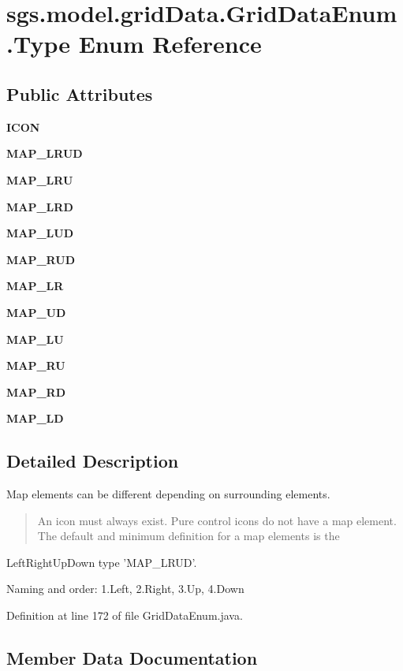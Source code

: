 \section{sgs.\-model.\-grid\-Data.\-Grid\-Data\-Enum.\-Type Enum Reference}
\label{enumsgs_1_1model_1_1grid_data_1_1_grid_data_enum_1_1_type}
\subsection*{Public Attributes}
\begin{DoxyCompactItemize}
\item 
{\bf I\-C\-O\-N}
\item 
{\bf M\-A\-P\-\_\-\-L\-R\-U\-D}
\item 
{\bf M\-A\-P\-\_\-\-L\-R\-U}
\item 
{\bf M\-A\-P\-\_\-\-L\-R\-D}
\item 
{\bf M\-A\-P\-\_\-\-L\-U\-D}
\item 
{\bf M\-A\-P\-\_\-\-R\-U\-D}
\item 
{\bf M\-A\-P\-\_\-\-L\-R}
\item 
{\bf M\-A\-P\-\_\-\-U\-D}
\item 
{\bf M\-A\-P\-\_\-\-L\-U}
\item 
{\bf M\-A\-P\-\_\-\-R\-U}
\item 
{\bf M\-A\-P\-\_\-\-R\-D}
\item 
{\bf M\-A\-P\-\_\-\-L\-D}
\end{DoxyCompactItemize}


\subsection{Detailed Description}
Map elements can be different depending on surrounding elements. \begin{quotation}
An icon must always exist. Pure control icons do not have a map element. The default and minimum definition for a map elements is the

\end{quotation}
Left\-Right\-Up\-Down type 'M\-A\-P\-\_\-\-L\-R\-U\-D'.

Naming and order\-: 1.\-Left, 2.\-Right, 3.\-Up, 4.\-Down 

Definition at line 172 of file Grid\-Data\-Enum.\-java.



\subsection{Member Data Documentation}
